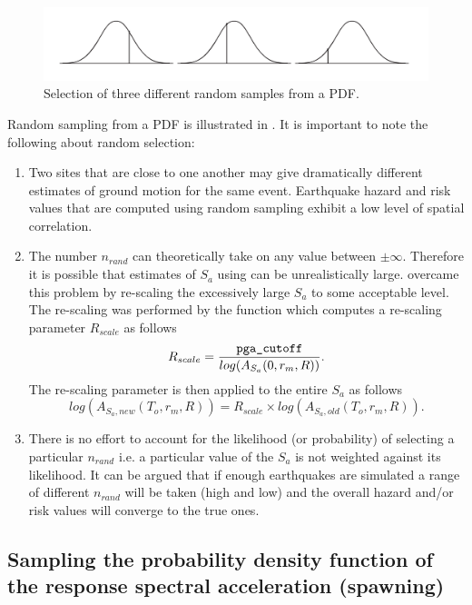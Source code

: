 \begin{figure}
\includegraphics[width=1\textwidth]{diags/fig-hattn-random}
\caption{Selection of three different random samples from a PDF.}
\label{fig:hattn-randomsamp}
\end{figure}
Random sampling from a PDF is illustrated in
. It is important to note the following
about random selection:
\begin{enumerate}
\item Two sites that are close to one another may give
dramatically different estimates of ground motion for the same
event. Earthquake hazard and risk values that are computed using
random sampling exhibit a low level of spatial correlation. \item
The number $n_{rand}$ can theoretically take on any value between
$\pm \infty$. Therefore it is possible that estimates of $S_a$
using  can be unrealistically large.
\cite{dr_Dhu02b} overcame this problem by re-scaling the
excessively large $S_a$ to some acceptable level. The re-scaling
was performed by the function  which
computes a re-scaling parameter $R_{scale}$ as follows
\begin{equation}
R_{scale} =
\frac{\textrm{\typepar{pga}{\_cut}{off}}}{log(A_{S_a}(0,r_m,R))}.
\end{equation}
The re-scaling parameter is then applied to the entire $S_a$ as
follows
\begin{equation}
log(A_{S_a,new}(T_o,r_m,R)) = R_{scale} \times
log(A_{S_a,old}(T_o,r_m,R)).
\end{equation}
\item There is no effort to account for the likelihood (or
probability) of selecting a particular $n_{rand}$ i.e. a
particular value of the $S_a$ is not weighted against its
likelihood. It can be argued that if enough earthquakes are
simulated a range of different $n_{rand}$ will be taken (high and
low) and the overall hazard and/or risk values will converge to
the true ones.
\end{enumerate}


\subsection{Sampling the probability density function of the response spectral acceleration (spawning)}
\label{attn:uncert-pdfchoice}


